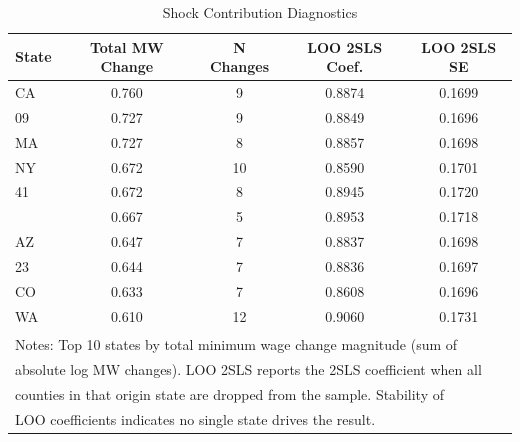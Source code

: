 \begin{table}[!h]
\centering
\caption{\label{tab:shockdiag}Shock Contribution Diagnostics}
\centering
\begin{tabular}[t]{lcccc}
\toprule
State & Total MW Change & N Changes & LOO 2SLS Coef. & LOO 2SLS SE\\
\midrule
CA & 0.760 & 9 & 0.8874 & 0.1699\\
09 & 0.727 & 9 & 0.8849 & 0.1696\\
MA & 0.727 & 8 & 0.8857 & 0.1698\\
NY & 0.672 & 10 & 0.8590 & 0.1701\\
41 & 0.672 & 8 & 0.8945 & 0.1720\\
\addlinespace
34 & 0.667 & 5 & 0.8953 & 0.1718\\
AZ & 0.647 & 7 & 0.8837 & 0.1698\\
23 & 0.644 & 7 & 0.8836 & 0.1697\\
CO & 0.633 & 7 & 0.8608 & 0.1696\\
WA & 0.610 & 12 & 0.9060 & 0.1731\\
\bottomrule
\multicolumn{5}{l}{\textsuperscript{} Notes: Top 10 states by total minimum wage change magnitude (sum of}\\
\multicolumn{5}{l}{absolute log MW changes). LOO 2SLS reports the 2SLS coefficient when all}\\
\multicolumn{5}{l}{counties in that origin state are dropped from the sample. Stability of}\\
\multicolumn{5}{l}{LOO coefficients indicates no single state drives the result.}\\
\end{tabular}
\end{table}
